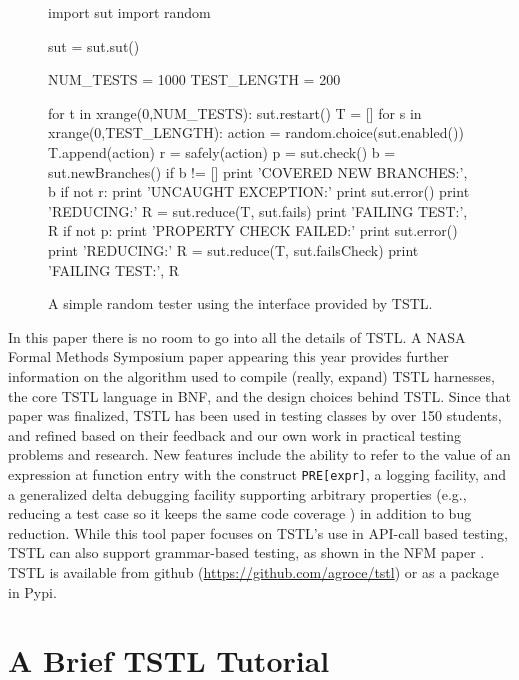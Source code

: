 \documentclass{sig-alternate}
\begin{document}
\begin{figure}
\begin{code}
import sut
import random

sut = sut.sut()

NUM\_TESTS = 1000
TEST\_LENGTH = 200 

for t in xrange(0,NUM\_TESTS):
     sut.restart()
     T = []
     for s in xrange(0,TEST\_LENGTH): 
         action = random.choice(sut.enabled())
         T.append(action)
         r = safely(action)
         p = sut.check()
         b = sut.newBranches()
         if b != []
            print 'COVERED NEW BRANCHES:', b
         if not r:
            print 'UNCAUGHT EXCEPTION:' 
            print sut.error() 
            print 'REDUCING:'
            R = sut.reduce(T, sut.fails) 
            print 'FAILING TEST:', R
         if not p:
            print 'PROPERTY CHECK FAILED:' 
            print sut.error()
            print 'REDUCING:'
            R = sut.reduce(T, sut.failsCheck) 
            print 'FAILING TEST:', R
\end{code}
\caption{A simple random tester using the interface provided by TSTL.}
\label{fig:rt}
\end{figure}

In this paper there is no room to go into all the details of TSTL.  A
NASA Formal Methods Symposium paper \cite{NFM15} appearing this year
provides further information on the algorithm used to compile
(really, expand) TSTL harnesses, the core TSTL language in BNF, and
the design choices behind TSTL.  Since that paper was finalized, TSTL
has been used in testing classes by over 150 students, and refined
based on their feedback and our own work in practical testing problems
and research.  New features include the ability to refer to the value
of an expression at function entry with the construct {\tt PRE[expr]},
a logging facility, and a generalized delta debugging \cite{DD}
facility supporting arbitrary properties (e.g., reducing a test case
so it keeps the same code coverage \cite{icst2014}) in addition to bug
reduction.  While this tool paper focuses on TSTL's use in API-call
based testing, TSTL can also support grammar-based testing, as shown
in the NFM paper \cite{NFM15}.  TSTL is available from github
(\url{https://github.com/agroce/tstl}) or as a package in Pypi.

\section{A Brief TSTL Tutorial}
\end{document}
